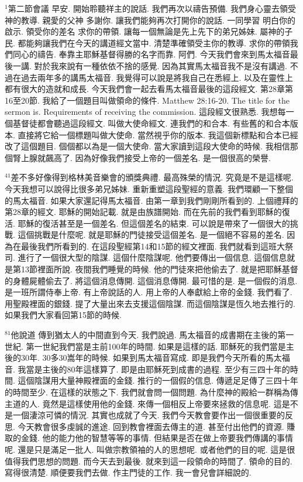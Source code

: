 \documentclass{book}
\begin{document}
$^{1}$第二節會議 早安.
開始聆聽祥主的說話.
我們再次以禱告預備.
我們身心靈去領受神的教導.
親愛的父神 多謝你.
讓我們能夠再次打開你的說話.
一同學習 明白你的啟示.
領受你的差名 求你的帶領.
讓每一個無論是先上先下的弟兄姊妹.
屬神的子民.
都能夠讓我們在今天的講道經文當中.
清楚準確領受主你的教導.
求你的帶領我們同心的禱告.
奉靠主耶穌基督得勝的名字而靠.
阿們.
今天我們會來到馬太福音最後一講.
對於我來說有一種依依不捨的感覺.
因為其實馬太福音我不是沒有講過.
不過在過去兩年多的講馬太福音.
我覺得可以說是將我自己在悉經上.
以及在靈性上都有很大的造就和成長.
今天我們會一起去看馬太福音最後的這段經文.
第28章第16至20節.
我給了一個題目叫做領命的條件.
Matthew 28:16-20.
The title for the sermon is.
Requirements of receiving the commission.
這段經文很熟悉.
我想每一個基督徒都會聽過這段經文.
叫做大使命經文.
連我們的和合本.
有些舊的和合本版本.
直接將它給一個標題叫做大使命.
當然視乎你的版本.
我這個新標點和合本已經改了這個題目.
個個都以為是一個大使命.
當大家讀到這段大使命的時候.
我相信那個腎上腺就飆高了.
因為好像我們接受上帝的一個差名.
是一個很高的榮譽.

$^{41}$差不多好像得到格林美音樂會的頒獎典禮.
最高殊榮的情況.
究竟是不是這樣呢.
今天我想可以說得比很多弟兄姊妹.
重新重塑這段聖經的意義.
我們環顧一下整個的馬太福音.
如果大家還記得馬太福音.
由第一章到我們剛剛所看到的.
上個禮拜的第28章的經文.
耶穌的開始記載.
就是由族譜開始.
而在先前的我們看到耶穌的復活.
耶穌的復活甚至是一個差名.
但這個差名的結束.
可以說是帶來了一個很大的挑戰.
這個挑戰是什麼呢.
就是耶穌的門徒接受這個差名.
是一個絕不容易的差名.
因為在最後我們所看到的.
在這段聖經第14和15節的經文裡面.
我們就看到這班大祭司.
進行了一個很大型的陰謀.
這個什麼陰謀呢.
他們要傳出一個信息.
這個信息就是第13節裡面所說.
夜間我們睡覺的時候.
他的門徒來把他偷去了.
就是把耶穌基督的身體屍體偷去了.
將這個消息傳開.
這個消息傳開.
最可惜的是.
是一個假的消息.
是一班所謂侍奉上帝.
有上帝說話的人.
用上帝的人奉獻給上帝的金錢.
我們看了.
用聖殿裡面的銀錢.
提了大量出來去支援這個陰謀.
而這個陰謀是恆久地去推行的.
如果我們大家看回第15節的時候.

$^{81}$他說道 傳到猶太人的中間直到今天.
我們說過.
馬太福音的成書期在主後的第一世紀.
第一世紀我們當是主前100年的時間.
如果是這樣的話.
耶穌死的我們當是主後的30年.
30多30嵩年的時候.
如果到馬太福音寫成.
即是我們今天所看的馬太福音.
我當是主後的80年這樣算了.
即是由耶穌死到成書的過程.
至少有三四十年的時間.
這個陰謀用大量神殿裡面的金錢.
推行的一個假的信息.
傳遞足足傳了三四十年的時間至少.
在這樣的狀態之下.
我們就會問一個問題.
為什麼神的殿給一群稱為傳主道的人.
竟然是這樣使用他的金錢.
來傳一個相反上帝要來拯救的信息呢.
這是不是一個淒涼可憐的情況.
其實也成就了今天.
我們今天教會要作出一個很重要的反思.
今天教會很多虔誠的進途.
回到教會裡面去傳主的道.
甚至付出他們的資源.
賺取的金錢.
他的能力他的智慧等等的事情.
但結果是否在做上帝要我們傳講的事情呢.
還是只是滿足一批人.
叫做宗教領袖的人的思想呢.
或者他們的目的呢.
這是很值得我們思想的問題.
而今天去到最後.
就來到這一段領命的時間了.
領命的目的.
寫得很清楚.
順便要我們去做.
作主門徒的工作.
我一會兒會詳細說的.
\end{document}
